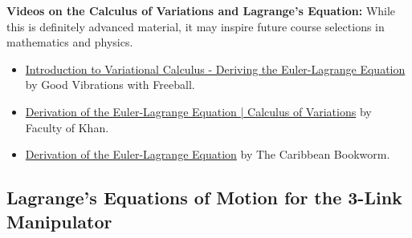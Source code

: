\bigskip

\textbf{Videos on the Calculus of Variations and Lagrange's Equation:} While this is definitely advanced material, it may inspire future course selections in mathematics and physics.
\begin{itemize}
    \item \href{https://youtu.be/VCHFCXgYdvY}{Introduction to Variational Calculus - Deriving the Euler-Lagrange Equation} by Good Vibrations with Freeball.
    \item \href{https://youtu.be/sFqp2lCEvwM}{Derivation of the Euler-Lagrange Equation | Calculus of Variations} by Faculty of Khan.
    \item \href{https://youtu.be/xO7cKGOW3lA}{Derivation of the Euler-Lagrange Equation} by The Caribbean Bookworm. 
\end{itemize}

\subsection{Lagrange's Equations of Motion for the 3-Link Manipulator}
\label{sec:3LinkLagrangeEquations}


